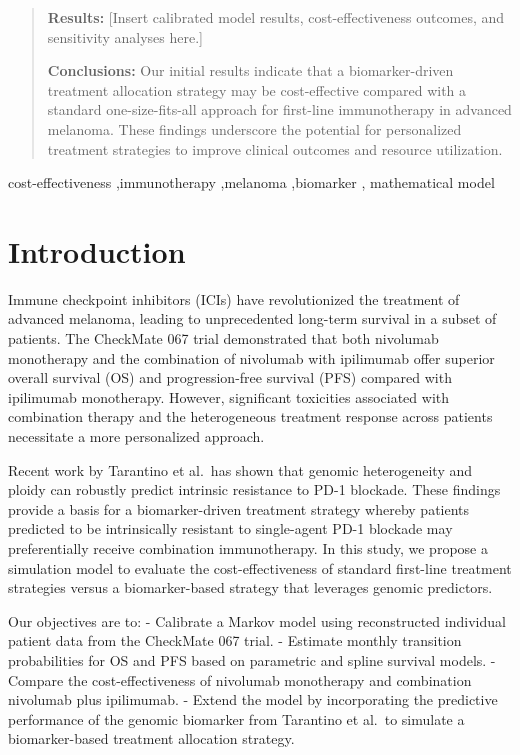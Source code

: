 \documentclass[preprint, 3p,
authoryear]{elsarticle} %
\begin{document}
\begin{frontmatter}
\begin{abstract}
  \textbf{Results:} {[}Insert calibrated model results,
  cost-effectiveness outcomes, and sensitivity analyses here.{]}

  \textbf{Conclusions:} Our initial results indicate that a
  biomarker-driven treatment allocation strategy may be cost-effective
  compared with a standard one-size-fits-all approach for first-line
  immunotherapy in advanced melanoma. These findings underscore the
  potential for personalized treatment strategies to improve clinical
  outcomes and resource utilization.
  \end{abstract}
    \begin{keyword}
    cost-effectiveness \sep immunotherapy \sep melanoma \sep biomarker \sep 
    mathematical model
  \end{keyword}
  
 \end{frontmatter}

\section{Introduction}\label{introduction}

Immune checkpoint inhibitors (ICIs) have revolutionized the treatment of
advanced melanoma, leading to unprecedented long-term survival in a
subset of patients. The CheckMate 067 trial demonstrated that both
nivolumab monotherapy and the combination of nivolumab with ipilimumab
offer superior overall survival (OS) and progression-free survival (PFS)
compared with ipilimumab monotherapy. However, significant toxicities
associated with combination therapy and the heterogeneous treatment
response across patients necessitate a more personalized approach.

Recent work by Tarantino et al.~has shown that genomic heterogeneity and
ploidy can robustly predict intrinsic resistance to PD-1 blockade. These
findings provide a basis for a biomarker-driven treatment strategy
whereby patients predicted to be intrinsically resistant to single-agent
PD-1 blockade may preferentially receive combination immunotherapy. In
this study, we propose a simulation model to evaluate the
cost-effectiveness of standard first-line treatment strategies versus a
biomarker-based strategy that leverages genomic predictors.

Our objectives are to: - Calibrate a Markov model using reconstructed
individual patient data from the CheckMate 067 trial. - Estimate monthly
transition probabilities for OS and PFS based on parametric and spline
survival models. - Compare the cost-effectiveness of nivolumab
monotherapy and combination nivolumab plus ipilimumab. - Extend the
model by incorporating the predictive performance of the genomic
biomarker from Tarantino et al.~to simulate a biomarker-based treatment
allocation strategy.
\end{document}
